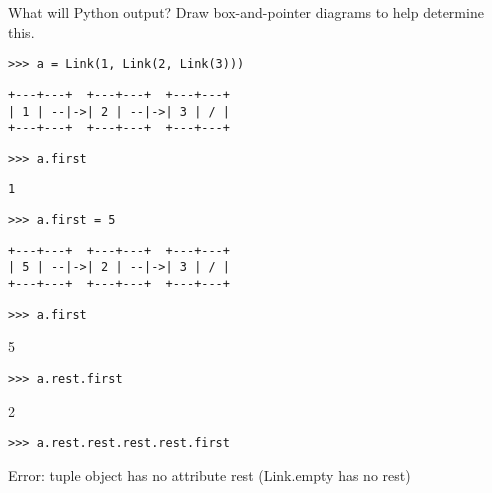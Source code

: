 \begin{blocksection}
\question What will Python output? Draw box-and-pointer diagrams to help determine this.

\begin{lstlisting}
>>> a = Link(1, Link(2, Link(3)))
\end{lstlisting}
\begin{solution}[0in]
\begin{lstlisting}
+---+---+  +---+---+  +---+---+
| 1 | --|->| 2 | --|->| 3 | / |
+---+---+  +---+---+  +---+---+
\end{lstlisting}
\end{solution}

\begin{lstlisting}
>>> a.first
\end{lstlisting}
\begin{solution}[.5in]
\begin{lstlisting}
1
\end{lstlisting}
\end{solution}

\begin{lstlisting}
>>> a.first = 5
\end{lstlisting}
\begin{solution}[0in]
\begin{lstlisting}
+---+---+  +---+---+  +---+---+
| 5 | --|->| 2 | --|->| 3 | / |
+---+---+  +---+---+  +---+---+
\end{lstlisting}
\end{solution}

\begin{lstlisting}
>>> a.first
\end{lstlisting}
\begin{solution}[.5in]
5
\end{solution}

\begin{lstlisting}
>>> a.rest.first
\end{lstlisting}
\begin{solution}[.5in]
2
\end{solution}

\begin{lstlisting}
>>> a.rest.rest.rest.rest.first
\end{lstlisting}
\begin{solution}[.5in]
Error: tuple object has no attribute rest (Link.empty has no rest)
\end{solution}
\end{blocksection}

